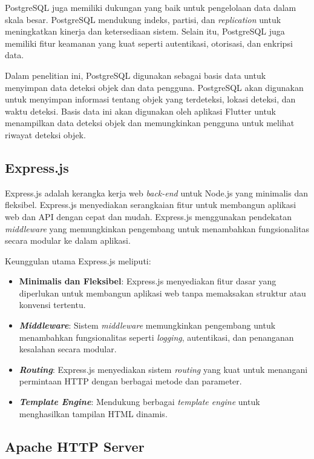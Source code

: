 PostgreSQL juga memiliki dukungan yang baik untuk pengelolaan data dalam skala besar. PostgreSQL mendukung indeks, partisi, dan \emph{replication} untuk meningkatkan kinerja dan ketersediaan sistem. Selain itu, PostgreSQL juga memiliki fitur keamanan yang kuat seperti autentikasi, otorisasi, dan enkripsi data.

Dalam penelitian ini, PostgreSQL digunakan sebagai basis data untuk menyimpan data deteksi objek dan data pengguna. PostgreSQL akan digunakan untuk menyimpan informasi tentang objek yang terdeteksi, lokasi deteksi, dan waktu deteksi. Basis data ini akan digunakan oleh aplikasi Flutter untuk menampilkan data deteksi objek dan memungkinkan pengguna untuk melihat riwayat deteksi objek.

\subsection{Express.js}

Express.js adalah kerangka kerja web \emph{back-end} untuk Node.js yang minimalis dan fleksibel. Express.js menyediakan serangkaian fitur untuk membangun aplikasi web dan API dengan cepat dan mudah. Express.js menggunakan pendekatan \emph{middleware} yang memungkinkan pengembang untuk menambahkan fungsionalitas secara modular ke dalam aplikasi. \parencite*{expressjs2024}

Keunggulan utama Express.js meliputi:
\begin{itemize}[nolistsep]
  \item \textbf{Minimalis dan Fleksibel}: Express.js menyediakan fitur dasar yang diperlukan untuk membangun aplikasi web tanpa memaksakan struktur atau konvensi tertentu.
  \item \textbf{\emph{Middleware}}: Sistem \emph{middleware} memungkinkan pengembang untuk menambahkan fungsionalitas seperti \emph{logging}, autentikasi, dan penanganan kesalahan secara modular.
  \item \textbf{\emph{Routing}}: Express.js menyediakan sistem \emph{routing} yang kuat untuk menangani permintaan HTTP dengan berbagai metode dan parameter.
  \item \textbf{\emph{Template Engine}}: Mendukung berbagai \emph{template engine} untuk menghasilkan tampilan HTML dinamis.
\end{itemize}

\subsection{Apache HTTP Server}


